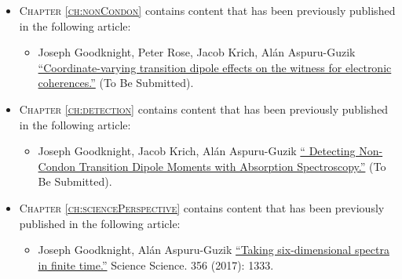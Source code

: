 \singlespacing

\noindent \begin{itemize} \setlength\itemsep{1em}

\item[] \textsc{Chapter \ref{ch:nonCondon}} contains content that has been previously published in the following article:
\begin{itemize}
\item Joseph Goodknight, Peter Rose, Jacob Krich, Al\'{a}n Aspuru-Guzik \href{http://aspuru.chem.harvard.edu/publications/}{ ``Coordinate-varying transition dipole effects on the witness for electronic coherences.''}  (To Be Submitted).  %
\end{itemize}

\item[] \textsc{Chapter \ref{ch:detection}} contains content that has been previously published in the following article:
\begin{itemize}
\item Joseph Goodknight, Jacob Krich, Al\'{a}n Aspuru-Guzik \href{http://aspuru.chem.harvard.edu/publications/}{ `` Detecting Non-Condon Transition Dipole Moments with Absorption Spectroscopy.''}  (To Be Submitted).  %
\end{itemize}

\item[] \textsc{Chapter \ref{ch:sciencePerspective}} contains content that has been previously published in the following article:
\begin{itemize}
\item  Joseph Goodknight, Al\'{a}n Aspuru-Guzik \href{http://science.sciencemag.org/content/356/6345/1333}{``Taking six-dimensional spectra in finite time.''} \mbox{Science} Science. 356 (2017): 1333.
\end{itemize}

\end{itemize}

\doublespacing
